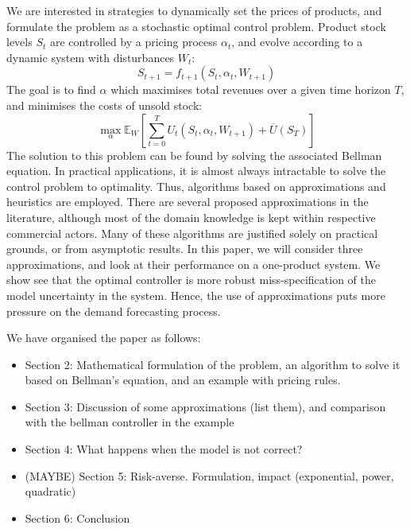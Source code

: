 \documentclass[main.tex]{subfiles}
\begin{document}
We are interested in strategies to dynamically set the prices of products, and
formulate the problem as a stochastic optimal control problem.
Product stock levels $S_t$ are controlled by a pricing process
$\alpha_t$, and evolve according to a dynamic system with disturbances
$W_t$:
\begin{equation}
S_{t+1}=f_{t+1}(S_t,\alpha_t,W_{t+1})
\end{equation}
The goal is to find $\alpha$ which maximises total revenues over a
given time horizon $T$, and
minimises the costs of unsold stock:
\begin{equation}
  \max_{\alpha}\mathbb E_W\left[ \sum_{t=0}^TU_t(S_t,\alpha_t,W_{t+1})
  + \overline{U}(S_T)\right]
\end{equation}
The solution to this problem can be found by solving the associated
Bellman equation. In practical applications, it is almost always
intractable to solve the control problem to optimality.
Thus, algorithms based on approximations and heuristics are employed.
There are several proposed approximations in the
literature, although most of the domain knowledge is kept within
respective commercial actors.
Many of these algorithms are justified solely on practical grounds, or
from asymptotic results.
In this paper, we will consider three approximations,
and look at their performance on a one-product system.
We show see that the optimal controller is more robust
miss-specification of the model uncertainty in the system.
Hence, the use of approximations puts more pressure on the
demand forecasting process.

We have organised the paper as follows:
\begin{itemize}
\item Section 2: Mathematical formulation of the problem, an algorithm
  to solve it based on Bellman's equation, and an example with pricing rules.
\item Section 3: Discussion of some approximations (list them), and
  comparison with the bellman controller in the example
\item Section 4: What happens when the model is not correct?
\item (MAYBE) Section 5: Risk-averse. Formulation, impact
  (exponential, power, quadratic)
\item Section 6: Conclusion
\end{itemize}


\biblio
\end{document}
